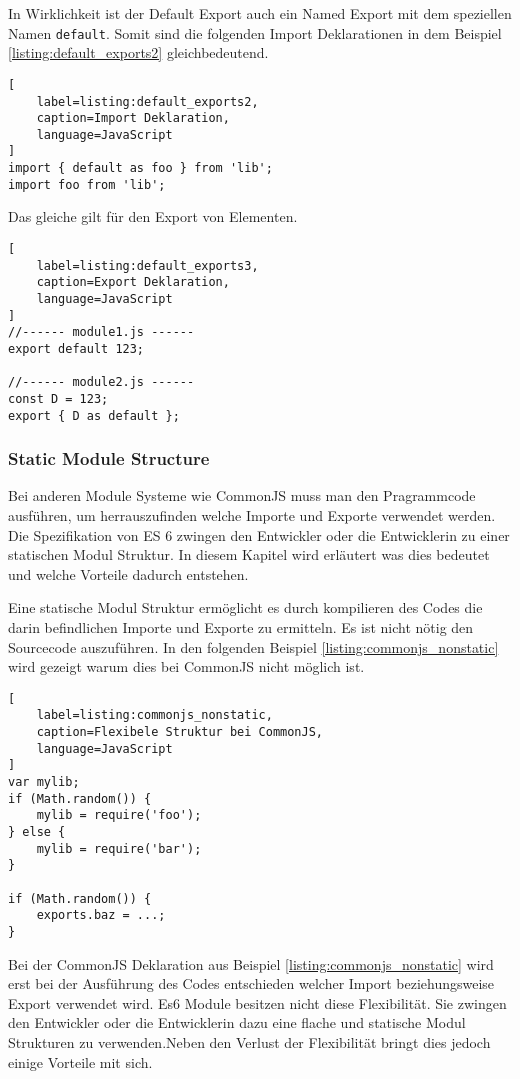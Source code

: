 In Wirklichkeit ist der Default Export auch ein Named Export mit dem speziellen Namen \lstinline{default}. Somit sind die folgenden Import Deklarationen in dem Beispiel \ref{listing:default_exports2} gleichbedeutend. \autocite{AxelRauschmayer}

 \begin{lstlisting}[
    label=listing:default_exports2,
    caption=Import Deklaration,
	language=JavaScript
]
import { default as foo } from 'lib';
import foo from 'lib';
\end{lstlisting}

Das gleiche gilt für den Export von Elementen.

\begin{lstlisting}[
    label=listing:default_exports3,
    caption=Export Deklaration,
	language=JavaScript
]
//------ module1.js ------
export default 123;

//------ module2.js ------
const D = 123;
export { D as default };
\end{lstlisting}

\subsubsection{Static Module Structure}
Bei anderen Module Systeme wie CommonJS muss man den Pragrammcode ausführen, um herrauszufinden welche Importe und Exporte verwendet werden. Die Spezifikation von ES 6 zwingen den Entwickler oder die Entwicklerin zu einer statischen Modul Struktur. In diesem Kapitel wird erläutert was dies bedeutet und welche Vorteile dadurch entstehen.
\autocite{AxelRauschmayer}

Eine statische Modul Struktur ermöglicht es durch kompilieren des Codes die darin befindlichen Importe und Exporte zu ermitteln. Es ist nicht nötig den Sourcecode auszuführen. In den folgenden Beispiel \ref{listing:commonjs_nonstatic} wird gezeigt warum dies bei CommonJS nicht möglich ist. \autocite{AxelRauschmayer}

\begin{lstlisting}[
    label=listing:commonjs_nonstatic,
    caption=Flexibele Struktur bei CommonJS,
	language=JavaScript
]
var mylib;
if (Math.random()) {
    mylib = require('foo');
} else {
    mylib = require('bar');
}

if (Math.random()) {
    exports.baz = ...;
}
\end{lstlisting}

Bei der CommonJS Deklaration aus Beispiel \ref{listing:commonjs_nonstatic} wird erst bei der Ausführung des Codes entschieden welcher Import beziehungsweise Export verwendet wird. Es6 Module besitzen nicht diese Flexibilität. Sie zwingen den Entwickler oder die Entwicklerin dazu eine flache und statische Modul Strukturen zu verwenden.Neben den Verlust der Flexibilität bringt dies jedoch einige Vorteile mit sich. \autocite{AxelRauschmayer}

